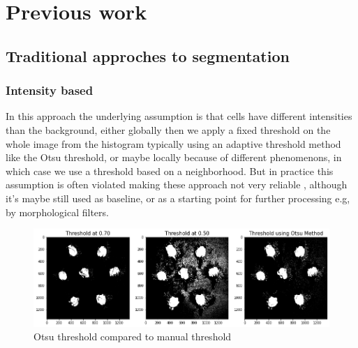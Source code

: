 \documentclass[main.tex]{subfiles}
\begin{document}
\chapter{Previous work}

\section{Traditional approches to segmentation}
\subsection{Intensity based}


In this approach the underlying assumption is that cells have different intensities than the background, either globally then we apply a fixed threshold on the whole image from the histogram typically using an adaptive threshold method like the Otsu\cite{Otsu1979} threshold, or maybe locally because of different phenomenons, in which case we use a threshold based on a neighborhood. But in practice this assumption is often violated making these approach not very reliable \cite{Bengtsson2004}, although it's maybe still used as baseline, or as a starting point for further processing e.g, by morphological filters. \\

\begin{figure}[H]
    \centering
    \includegraphics[width=12cm]{images/otsu.png}
    \caption{Otsu threshold compared to manual threshold}
    \label{fig:otsu}
\end{figure}
\end{document}
